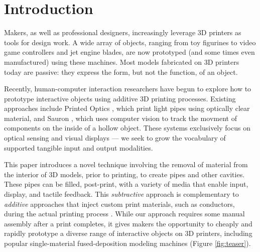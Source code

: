 
\section{Introduction}
Makers, as well as professional designers, increasingly leverage 3D printers as tools for design work.  A wide array of objects, ranging from toy figurines to video game controllers and jet engine blades, are now prototyped (and some times even manufactured) using these machines.  Most models fabricated on 3D printers today are passive: they express the form, but not the function, of an object.  

Recently, human-computer interaction researchers have begun to explore how to prototype interactive objects using additive 3D printing processes.
Existing approaches include Printed Optics \cite{Willis-printedoptics}, which print light pipes using optically clear material, and Sauron \cite{Savage-sauron}, which uses computer vision to track the movment of components on the inside of a hollow object. These systems exclusively focus on optical sensing and visual displays --- we seek to grow the vocabulary of supported tangible input and output modalities.

This paper introduces a novel technique involving the removal of material from the interior of 3D models, prior to printing, to create pipes and other cavities.  These pipes can be filled, post-print, with a variety of media that enable input, display, and tactile feedback.  This {\em subtractive} approach is complementary to {\em additive} approaches that inject custom print materials, such as conductors, during the actual printing process \cite{Sells-reprap}. While our approach requires some manual assembly after a print completes, it gives makers the opportunity to cheaply and rapidly prototype a diverse range of interactive objects on 3D printers, including popular single-material fused-deposition modeling machines (Figure \ref{fig:teaser}).

